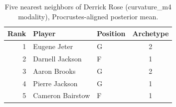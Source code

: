 \begin{table}[htbp]
  \centering\small
  \begin{tabular}{rllc}
    \toprule
    Rank & Player & Position & Archetype \\
    \midrule
    1 & Eugene Jeter & G & 2 \\
    2 & Darnell Jackson & F & 1 \\
    3 & Aaron Brooks & G & 2 \\
    4 & Pierre Jackson & G & 1 \\
    5 & Cameron Bairstow & F & 1 \\
    \bottomrule
  \end{tabular}
  \caption{Five nearest neighbors of Derrick Rose (curvature_m4 modality), Procrustes-aligned posterior mean.}
  \label{tab:Derrick_Rose_neighbors_curvature_m4}
\end{table}

